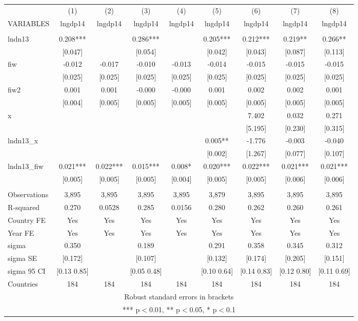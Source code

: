 \begin{tabular}{lcccccccc} \hline
 & (1) & (2) & (3) & (4) & (5) & (6) & (7) & (8) \\
VARIABLES & lngdp14 & lngdp14 & lngdp14 & lngdp14 & lngdp14 & lngdp14 & lngdp14 & lngdp14 \\ \hline
 &  &  &  &  &  &  &  &  \\
lndn13 & 0.208*** &  & 0.286*** &  & 0.205*** & 0.212*** & 0.219** & 0.266** \\
 & [0.047] &  & [0.054] &  & [0.042] & [0.043] & [0.087] & [0.113] \\
fiw & -0.012 & -0.017 & -0.010 & -0.013 & -0.014 & -0.015 & -0.015 & -0.015 \\
 & [0.025] & [0.025] & [0.025] & [0.025] & [0.025] & [0.025] & [0.025] & [0.025] \\
fiw2 & 0.001 & 0.001 & -0.000 & -0.000 & 0.001 & 0.002 & 0.002 & 0.001 \\
 & [0.004] & [0.005] & [0.005] & [0.005] & [0.005] & [0.005] & [0.005] & [0.005] \\
x &  &  &  &  &  & 7.402 & 0.032 & 0.271 \\
 &  &  &  &  &  & [5.195] & [0.230] & [0.315] \\
lndn13\_x &  &  &  &  & 0.005** & -1.776 & -0.003 & -0.040 \\
 &  &  &  &  & [0.002] & [1.267] & [0.077] & [0.107] \\
lndn13\_fiw & 0.021*** & 0.022*** & 0.015*** & 0.008* & 0.020*** & 0.022*** & 0.021*** & 0.021*** \\
 & [0.005] & [0.005] & [0.005] & [0.004] & [0.005] & [0.005] & [0.006] & [0.006] \\
 &  &  &  &  &  &  &  &  \\
Observations & 3,895 & 3,895 & 3,895 & 3,895 & 3,879 & 3,895 & 3,895 & 3,895 \\
R-squared & 0.270 & 0.0528 & 0.285 & 0.0156 & 0.280 & 0.262 & 0.260 & 0.261 \\
Country FE & Yes & Yes & Yes & Yes & Yes & Yes & Yes & Yes \\
Year FE & Yes & Yes & Yes & Yes & Yes & Yes & Yes & Yes \\
sigma & 0.350 &  & 0.189 &  & 0.291 & 0.358 & 0.345 & 0.312 \\
sigma SE & [0.172] &  & [0.107] &  & [0.132] & [0.174] & [0.205] & [0.151] \\
sigma 95 CI & [0.13 0.85] &  & [0.05 0.48] &  & [0.10 0.64] & [0.14 0.83] & [0.12 0.80] & [0.11 0.69] \\
 Countries & 184 & 184 & 184 & 184 & 184 & 184 & 184 & 184 \\ \hline
\multicolumn{9}{c}{ Robust standard errors in brackets} \\
\multicolumn{9}{c}{ *** p$<$0.01, ** p$<$0.05, * p$<$0.1} \\
\end{tabular}
